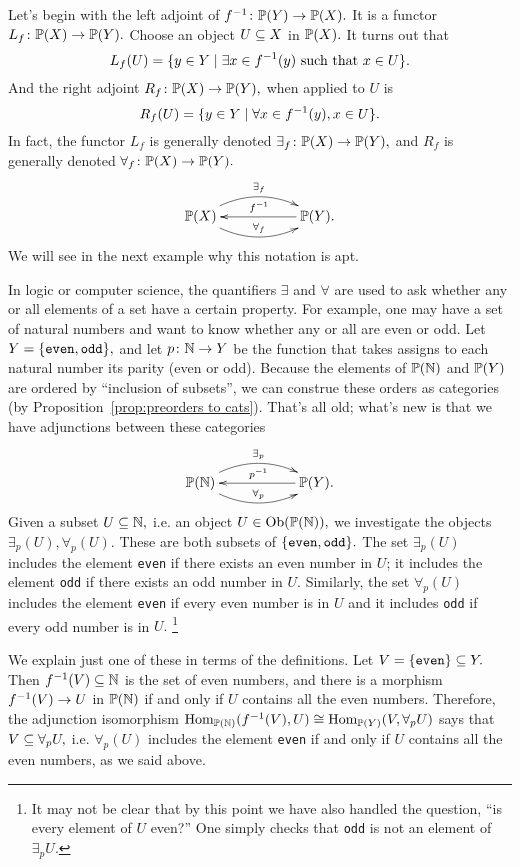 \documentclass[../main/CT4S-EN-RU]{subfiles}
\begin{document}
\begin{blockRUS}
\end{blockRUS}

\begin{blockENG}
Let's begin with the left adjoint of $f^\m1\taking\PP(Y)\to\PP(X).$ It is a functor $L_f\taking\PP(X)\to\PP(Y).$ Choose an object $U\ss X$ in $\PP(X).$ It turns out that
$$L_f(U)=\{y\in Y\|\exists x\in f^\m1(y)\tn{ such that }x\in U\}.$$
And the right adjoint $R_f\taking\PP(X)\to\PP(Y),$ when applied to $U$ is 
$$R_f(U)=\{y\in Y\|\forall x\in f^\m1(y), x\in U\}.$$
In fact, the functor $L_f$ is generally denoted $\exists_f\taking\PP(X)\to\PP(Y),$ and $R_f$ is generally denoted $\forall_f\taking\PP(X)\to\PP(Y).$ 
$$
\xymatrix{\PP(X)\ar@/^1.2pc/[rr]^{\exists_f}\ar@/_1.2pc/[rr]^{\forall_f}&&\PP(Y)\ar[ll]_{f^\m1}.}
$$
We will see in the next example why this notation is apt.
\end{blockENG}

\begin{blockRUS}
\end{blockRUS}

\begin{exampleENG}
In logic or computer science, the quantifiers $\exists$ and $\forall$ are used to ask whether any or all elements of a set have a certain property. For example, one may have a set of natural numbers and want to know whether any or all are even or odd.
Let $Y=\{{\tt even,odd}\},$ and let $p\taking\NN\to Y$ be the function that takes assigns to each natural number its parity (even or odd). Because the elements of $\PP(\NN)$ and $\PP(Y)$ are ordered by “inclusion of subsets”, we can construe these orders as categories (by Proposition~\ref{prop:preorders to cats}). That's all old; what's new is that we have adjunctions between these categories
$$
\xymatrix{\PP(\NN)\ar@/^1.2pc/[rr]^{\exists_p}\ar@/_1.2pc/[rr]^{\forall_p}&&\PP(Y)\ar[ll]_{p^\m1}.}
$$
Given a subset $U\ss\NN,$ i.e. an object $U\in\Ob(\PP(\NN)),$ we investigate the objects $\exists_p(U),\forall_p(U).$ These are both subsets of $\{{\tt even,odd}\}.$ The set $\exists_p(U)$ includes the element {\tt even} if there exists an even number in $U$; it includes the element {\tt odd} if there exists an odd number in $U.$ Similarly, the set $\forall_p(U)$ includes the element {\tt even} if every even number is in $U$ and it includes {\tt odd} if every odd number is in $U.$
\footnote{It may not be clear that by this point we have also handled the question, “is every element of $U$ even?” One simply checks that {\tt odd} is not an element of $\exists_pU.$}

We explain just one of these in terms of the definitions. Let $V=\{{\tt even}\}\ss Y.$ Then $f^\m1(V)\ss\NN$ is the set of even numbers, and there is a morphism $f^\m1(V)\to U$ in $\PP(\NN)$ if and only if $U$ contains all the even numbers. Therefore, the adjunction isomorphism $\Hom_{\PP(\NN)}(f^\m1(V),U)\iso\Hom_{\PP(Y)}(V,\forall_pU)$ says that $V\ss\forall_pU,$ i.e. $\forall_p(U)$ includes the element {\tt even} if and only if $U$ contains all the even numbers, as we said above.
\end{exampleENG}
\end{document}
